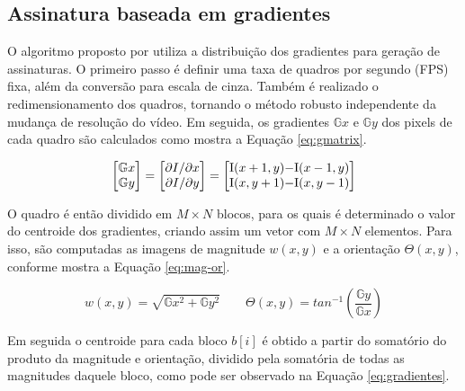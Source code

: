 %
%


\subsection{Assinatura baseada em gradientes}
\label{sec:gradientes}

	O algoritmo proposto por  utiliza a distribuição dos gradientes para geração de assinaturas. O primeiro passo é definir uma taxa de quadros por segundo (FPS) fixa, além da conversão para escala de cinza. Também é realizado o redimensionamento dos quadros, tornando o método robusto independente da mudança de resolução do vídeo. Em seguida, os gradientes $\mathbb{G}x$ e $\mathbb{G}y$ dos pixels de cada quadro são calculados como mostra a Equação \ref{eq:gmatrix}.

\begin{equation}
  \label{eq:gmatrix}
  \begin{bmatrix}
    \mathbb{G}x
    \\ 
    \mathbb{G}y
  \end{bmatrix}= 
  \begin{bmatrix}
    \partial I/\partial x
    \\ 
    \partial I/\partial y
  \end{bmatrix}=
  \begin{bmatrix}
    $I$(x+1, y) - $I$(x-1,y)
    \\ 
    $I$(x, y+1) - $I$(x,y-1)
  \end{bmatrix}
\end{equation}
    
	O quadro é então dividido em $M\times N$ blocos, para os quais é determinado o valor do centroide dos gradientes, criando assim um vetor com $M \times N$ elementos. Para isso, são computadas as imagens de magnitude \textit{$w(x,y)$} e a orientação \textit{$\Theta(x,y)$}, conforme mostra a Equação \ref{eq:mag-or}.
    
\begin{equation}
	\label{eq:mag-or}
    w(x,y) = \sqrt{\mathbb{G}x^{2} + \mathbb{G}y^{2}}
\qquad
\Theta(x,y) = tan^{-1}\left (\frac{\mathbb{G}y}{\mathbb{G}x} \right)
\end{equation}
    
    Em seguida o centroide para cada bloco $b[i]$ é obtido a partir do somatório do produto da magnitude e orientação, dividido pela somatória de todas as magnitudes daquele bloco, como pode ser observado na Equação \ref{eq:gradientes}.
    
